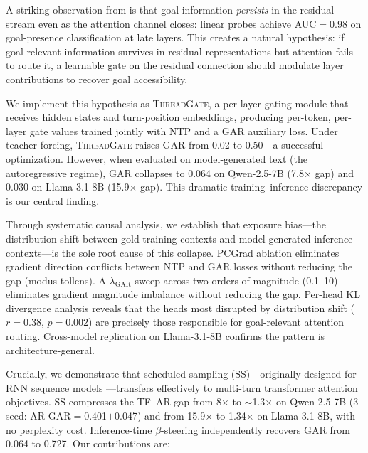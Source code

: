 \documentclass[11pt]{article}
\newcommand{\gar}{\textsc{GAR}}
\newcommand{\tg}{\textsc{ThreadGate}}
\begin{document}
A striking observation from \citet{dongre2026goal} is that goal information \emph{persists} in the residual stream even as the attention channel closes: linear probes achieve AUC$=$0.98 on goal-presence classification at late layers. This creates a natural hypothesis: if goal-relevant information survives in residual representations but attention fails to route it, a learnable gate on the residual connection should modulate layer contributions to recover goal accessibility.

We implement this hypothesis as \tg{}, a per-layer gating module that receives hidden states and turn-position embeddings, producing per-token, per-layer gate values trained jointly with NTP and a \gar{} auxiliary loss. Under teacher-forcing, \tg{} raises \gar{} from 0.02 to 0.50---a successful optimization. However, when evaluated on model-generated text (the autoregressive regime), \gar{} collapses to 0.064 on Qwen-2.5-7B (7.8$\times$ gap) and 0.030 on Llama-3.1-8B (15.9$\times$ gap). This dramatic training--inference discrepancy is our central finding.

Through systematic causal analysis, we establish that exposure bias---the distribution shift between gold training contexts and model-generated inference contexts---is the sole root cause of this collapse. PCGrad \citep{yu2020gradient} ablation eliminates gradient direction conflicts between NTP and \gar{} losses without reducing the gap (modus tollens). A $\lambda_{\text{GAR}}$ sweep across two orders of magnitude (0.1--10) eliminates gradient magnitude imbalance without reducing the gap. Per-head KL divergence analysis reveals that the heads most disrupted by distribution shift ($r=0.38$, $p=0.002$) are precisely those responsible for goal-relevant attention routing. Cross-model replication on Llama-3.1-8B confirms the pattern is architecture-general.

Crucially, we demonstrate that scheduled sampling (SS)---originally designed for RNN sequence models \citep{bengio2015scheduled}---transfers effectively to multi-turn transformer attention objectives. SS compresses the TF--AR gap from 8$\times$ to ${\sim}$1.3$\times$ on Qwen-2.5-7B (3-seed: AR \gar{}$=$0.401$\pm$0.047) and from 15.9$\times$ to 1.34$\times$ on Llama-3.1-8B, with no perplexity cost. Inference-time $\beta$-steering independently recovers \gar{} from 0.064 to 0.727. Our contributions are:
\end{document}
